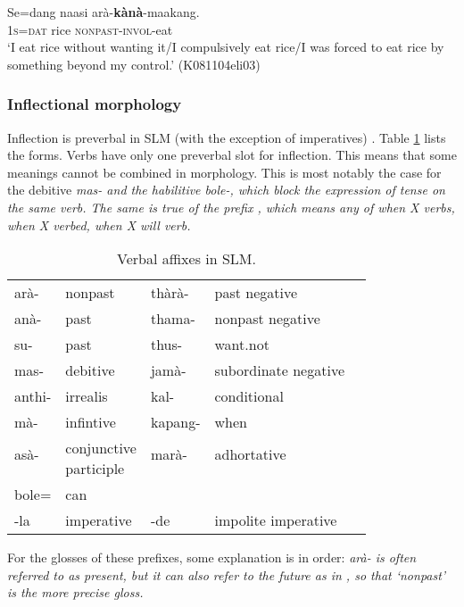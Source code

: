 \ea\label{ex:kana:dat}
\gll Se=dang naasi arà-\textbf{kànà}-maakang. \\
     \textsc{1s=dat} rice \textsc{nonpast}-\textsc{invol}-eat  \\
    `I eat rice without wanting it/I compulsively eat rice/I was forced to eat rice by something beyond my control.' (K081104eli03)
\z


\subsubsection{Inflectional morphology}
Inflection is preverbal in SLM (with the exception of imperatives) \citep{SmithEtAl2004,Slomanson2006cll}. Table \ref{tab:verbalaffixes} lists the forms. Verbs have only one preverbal slot for inflection. This means that some meanings cannot be combined in morphology. This is most notably the case for the debitive \em mas- \em and the habilitive \em bole-\em, which block the expression of tense on the same verb. The same is true of the prefix , which means any of \em when X verbs, when X verbed, when X will verb\em.

\begin{table}
    \centering
 \begin{tabular}{lllll}
arà-  & nonpast 	&  thàrà-   & past negative \\ 
anà-  & past 		&  thama-   & nonpast negative\\
su-   & past 		&  thus-   & want.not\\ 
mas-  & debitive 	&   jamà-    & subordinate negative \\
anthi-& irrealis  	&   kal-    & conditional   \\
mà-   & infintive  	&   kapang-  & when \\ 
asà-  & \multirow{2}{*}{\parbox{2cm}{conjunctive\\ 
		      participle} }  &  marà- & adhortative  \\ 
      &                &            & \\
\hline
bole= & can & & \\
\hline 
-la & imperative & -de & impolite imperative\\
 \end{tabular}
\caption{Verbal affixes in SLM.}
\label{tab:verbalaffixes}
\end{table}

For the glosses of these prefixes, some explanation is in order: \em arà- \em is often referred to as present, but it can also refer to the future as in , so that `nonpast' is the more precise gloss.


